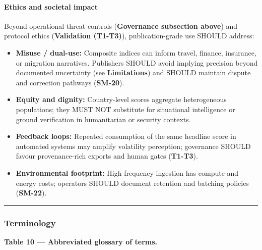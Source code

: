 \documentclass[
  11pt,
  peerreview,journal,onecolumn]{IEEEtran}
\providecommand{\tightlist}{%
  \setlength{\itemsep}{0pt}\setlength{\parskip}{0pt}}
\begin{document}
\hypertarget{ethics-and-societal-impact}{%
\paragraph{Ethics and societal
impact}\label{ethics-and-societal-impact}}

Beyond operational threat controls (\textbf{Governance subsection
above}) and protocol ethics (\textbf{Validation (T1-T3)}),
publication-grade use SHOULD address:

\begin{itemize}
\tightlist
\item
  \textbf{Misuse / dual-use:} Composite indices can inform travel,
  finance, insurance, or migration narratives. Publishers SHOULD avoid
  implying precision beyond documented uncertainty (see
  \textbf{Limitations}) and SHOULD maintain dispute and correction
  pathways (\textbf{SM-20}).
\item
  \textbf{Equity and dignity:} Country-level scores aggregate
  heterogeneous populations; they MUST NOT substitute for situational
  intelligence or ground verification in humanitarian or security
  contexts.
\item
  \textbf{Feedback loops:} Repeated consumption of the same headline
  score in automated systems may amplify volatility perception;
  governance SHOULD favour provenance-rich exports and human gates
  (\textbf{T1-T3}).
\item
  \textbf{Environmental footprint:} High-frequency ingestion has compute
  and energy costs; operators SHOULD document retention and batching
  policies (\textbf{SM-22}).
\end{itemize}

\begin{center}\rule{0.5\linewidth}{0.5pt}\end{center}

\hypertarget{terminology}{%
\subsubsection{Terminology}\label{terminology}}

\textbf{Table 10 --- Abbreviated glossary of terms.}
\end{document}
